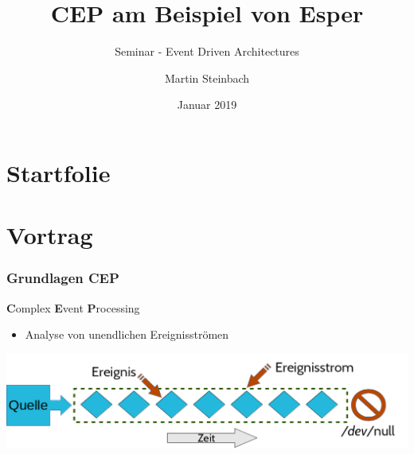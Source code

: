 \documentclass[usenames,dvipsnames]{beamer}
\title{CEP am Beispiel von Esper}
\subtitle{\scriptsize Seminar - Event Driven Architectures}
\institute{}
\author{Martin Steinbach}
\date{Januar 2019}
\begin{document}
\part{Startfolie}
\begin{frame}
\titlepage
\end{frame}




\part{Vortrag}
\section{Grundlagen CEP}


\begin{frame}{\textbf{C}omplex \textbf{E}vent \textbf{P}rocessing}

\begin{exampleblock}{}
    \begin{itemize}
        \item  Analyse von unendlichen Ereignisströmen  
    \end{itemize}
\end{exampleblock}

\begin{center}
   \includegraphics[scale=0.4]{img/01_cep}
\end{center}


\end{frame}
\end{document}

